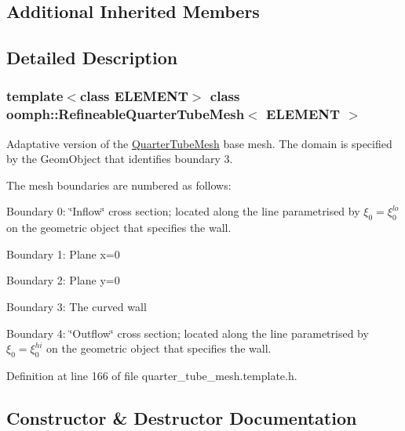 \subsection*{Additional Inherited Members}


\subsection{Detailed Description}
\subsubsection*{template$<$class E\+L\+E\+M\+E\+NT$>$\newline
class oomph\+::\+Refineable\+Quarter\+Tube\+Mesh$<$ E\+L\+E\+M\+E\+N\+T $>$}

Adaptative version of the \hyperlink{classoomph_1_1QuarterTubeMesh}{Quarter\+Tube\+Mesh} base mesh. The domain is specified by the Geom\+Object that identifies boundary 3.

The mesh boundaries are numbered as follows\+:
\begin{DoxyItemize}
\item Boundary 0\+: \char`\"{}\+Inflow\char`\"{} cross section; located along the line parametrised by $ \xi_0 = \xi_0^{lo} $ on the geometric object that specifies the wall.
\item Boundary 1\+: Plane x=0
\item Boundary 2\+: Plane y=0
\item Boundary 3\+: The curved wall
\item Boundary 4\+: \char`\"{}\+Outflow\char`\"{} cross section; located along the line parametrised by $ \xi_0 = \xi_0^{hi} $ on the geometric object that specifies the wall. 
\end{DoxyItemize}

Definition at line 166 of file quarter\+\_\+tube\+\_\+mesh.\+template.\+h.



\subsection{Constructor \& Destructor Documentation}
\mbox{\label{classoomph_1_1RefineableQuarterTubeMesh_a8aaace5bc465614ace0a9117b3ee169c}} 
